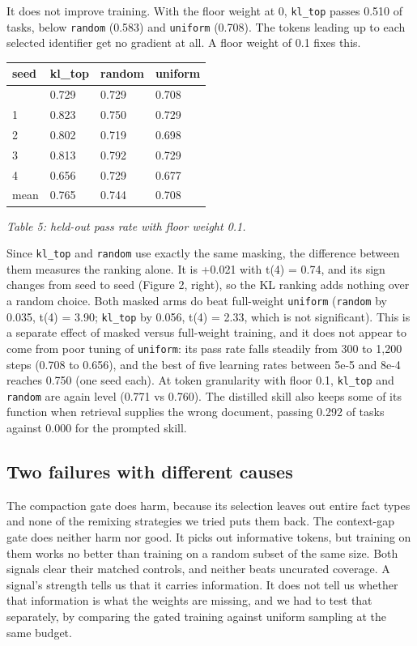 \documentclass[10pt]{article}
\begin{document}
It does not improve training. With the floor weight at 0, \texttt{kl\_top} passes 0.510 of tasks,
below \texttt{random} (0.583) and \texttt{uniform} (0.708). The tokens leading up to each selected
identifier get no gradient at all. A floor weight of 0.1 fixes this.

\begin{longtable}[]{@{}llll@{}}
\toprule\noalign{}
seed & kl\_top & random & uniform \\
\midrule\noalign{}
\endhead
\bottomrule\noalign{}
\endlastfoot
0 & 0.729 & 0.729 & 0.708 \\
1 & 0.823 & 0.750 & 0.729 \\
2 & 0.802 & 0.719 & 0.698 \\
3 & 0.813 & 0.792 & 0.729 \\
4 & 0.656 & 0.729 & 0.677 \\
mean & 0.765 & 0.744 & 0.708 \\
\end{longtable}

\emph{Table 5: held-out pass rate with floor weight 0.1.}

Since \texttt{kl\_top} and \texttt{random} use exactly the same masking, the difference between them
measures the ranking alone. It is +0.021 with t(4) = 0.74, and its sign changes from seed to
seed (Figure 2, right), so the KL ranking adds nothing over a random choice. Both masked arms
do beat full-weight \texttt{uniform} (\texttt{random} by 0.035, t(4) = 3.90; \texttt{kl\_top} by 0.056,
t(4) = 2.33, which is not significant). This is a separate effect of masked versus
full-weight training, and it does not appear to come from poor tuning of \texttt{uniform}: its pass
rate falls steadily from 300 to 1,200 steps (0.708 to 0.656), and the best of five learning
rates between 5e-5 and 8e-4 reaches 0.750 (one seed each). At token granularity with floor
0.1, \texttt{kl\_top} and \texttt{random} are again level (0.771 vs 0.760). The distilled skill also keeps
some of its function when retrieval supplies the wrong document, passing 0.292 of tasks
against 0.000 for the prompted skill.

\subsection{Two failures with different causes}

The compaction gate does harm, because its selection leaves out entire fact types and none of
the remixing strategies we tried puts them back. The context-gap gate does neither harm nor
good. It picks out informative tokens, but training on them works no better than training on
a random subset of the same size. Both signals clear their matched controls, and neither
beats uncurated coverage. A signal's strength tells us that it carries information. It does
not tell us whether that information is what the weights are missing, and we had to test that
separately, by comparing the gated training against uniform sampling at the same budget.
\end{document}
